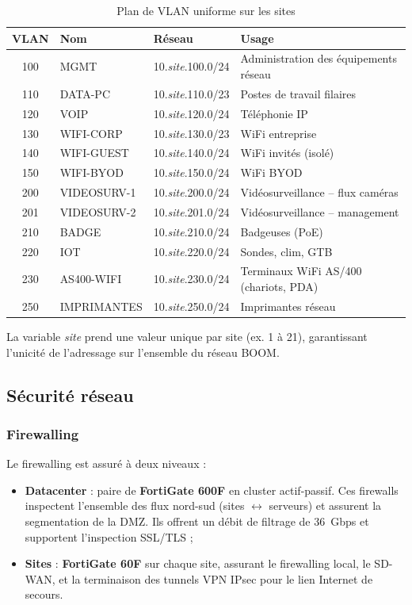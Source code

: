 \documentclass[12pt,a4paper]{report}
\begin{document}
\begin{table}[H]
\centering
\small
\begin{tabular}{clll}
\toprule
\textbf{VLAN} & \textbf{Nom} & \textbf{Réseau} & \textbf{Usage} \\
\midrule
100 & MGMT & 10.\textit{site}.100.0/24 & Administration des équipements réseau \\
110 & DATA-PC & 10.\textit{site}.110.0/23 & Postes de travail filaires \\
120 & VOIP & 10.\textit{site}.120.0/24 & Téléphonie IP \\
130 & WIFI-CORP & 10.\textit{site}.130.0/23 & WiFi entreprise \\
140 & WIFI-GUEST & 10.\textit{site}.140.0/24 & WiFi invités (isolé) \\
150 & WIFI-BYOD & 10.\textit{site}.150.0/24 & WiFi BYOD \\
200 & VIDEOSURV-1 & 10.\textit{site}.200.0/24 & Vidéosurveillance -- flux caméras \\
201 & VIDEOSURV-2 & 10.\textit{site}.201.0/24 & Vidéosurveillance -- management \\
210 & BADGE & 10.\textit{site}.210.0/24 & Badgeuses (PoE) \\
220 & IOT & 10.\textit{site}.220.0/24 & Sondes, clim, GTB \\
230 & AS400-WIFI & 10.\textit{site}.230.0/24 & Terminaux WiFi AS/400 (chariots, PDA) \\
250 & IMPRIMANTES & 10.\textit{site}.250.0/24 & Imprimantes réseau \\
\bottomrule
\end{tabular}
\caption{Plan de VLAN uniforme sur les sites}
\label{tab:vlan_sites}
\end{table}

La variable \textit{site} prend une valeur unique par site (ex. 1 à 21), garantissant l'unicité de l'adressage sur l'ensemble du réseau BOOM.

\subsection{Sécurité réseau}

\subsubsection{Firewalling}

Le firewalling est assuré à deux niveaux :

\begin{itemize}
\item \textbf{Datacenter} : paire de \textbf{FortiGate 600F} en cluster actif-passif. Ces firewalls inspectent l'ensemble des flux nord-sud (sites $\leftrightarrow$ serveurs) et assurent la segmentation de la DMZ. Ils offrent un débit de filtrage de 36~Gbps et supportent l'inspection SSL/TLS ;
\item \textbf{Sites} : \textbf{FortiGate 60F} sur chaque site, assurant le firewalling local, le SD-WAN, et la terminaison des tunnels VPN IPsec pour le lien Internet de secours.
\end{itemize}
\end{document}
